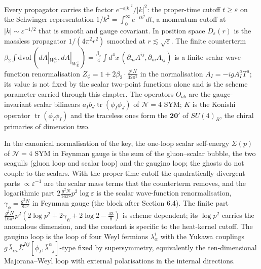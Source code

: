 \begin{remark}
Every propagator carries the factor $e^{-\varepsilon|k|^2}/|k|^2$: the proper-time cutoff $t\ge\varepsilon$ on the Schwinger representation $1/k^2=\int_0^\infty e^{-tk^2}dt$, a momentum cutoff at $|k|\sim\varepsilon^{-1/2}$ that is smooth and gauge covariant. In position space $D_\varepsilon(r)$ is the massless propagator $1/(4\pi^2r^2)$ smoothed at $r\lesssim\sqrt\varepsilon$. The finite counterterm $\beta_2\int\mathrm{dvol}\,(dA|_{W_{\mathbb R}^\perp},dA|_{W_{\mathbb R}^\perp})=\tfrac{\beta_2}4\int d^4x\,(\partial_mA^{ij},\partial_mA_{ij})$ is a finite scalar wave-function renormalisation $Z_\phi=1+2\beta_2\cdot\frac{g^2N}{32\pi^2}$ in the normalisation $A_I=-igA^a_IT^a$; its value is not fixed by the scalar two-point functions alone and is the scheme parameter carried through this chapter. The operators $O_{ab}$ are the gauge-invariant scalar bilinears $a_Ib_J\operatorname{tr}(\phi_I\phi_J)$ of $\mathcal N=4$ SYM; $K$ is the Konishi operator $\operatorname{tr}(\phi_I\phi_I)$ and the traceless ones form the $\mathbf{20'}$ of $SU(4)_R$, the chiral primaries of dimension two.
\end{remark}

\begin{remark}
In the canonical normalisation of the key, the one-loop scalar self-energy $\Sigma(p)$ of $\mathcal N=4$ SYM in Feynman gauge is the sum of the gluon--scalar bubble, the two seagulls (gluon loop and scalar loop) and the gaugino loop; the ghosts do not couple to the scalars. With the proper-time cutoff the quadratically divergent parts $\propto\varepsilon^{-1}$ are the scalar mass terms that the counterterm removes, and the logarithmic part $2\frac{g^2N}{16\pi^2}p^2\log\varepsilon$ is the scalar wave-function renormalisation, $\gamma_\phi=\frac{g^2N}{8\pi^2}$ in Feynman gauge (the block after Section 6.4). The finite part $\frac{g^2N}{16\pi^2}p^2(2\log p^2+2\gamma_E+2\log2-\tfrac{43}8)$ is scheme dependent; its $\log p^2$ carries the anomalous dimension, and the constant is specific to the heat-kernel cutoff. The gaugino loop is the loop of four Weyl fermions $\lambda^i_\alpha$ with the Yukawa couplings $g\,\bar\lambda_{\dot\alpha i}\bar\Sigma^{Iij}[\phi_I,\bar\lambda^{\dot\alpha}{}_j]$-type fixed by supersymmetry, equivalently the ten-dimensional Majorana--Weyl loop with external polarisations in the internal directions.
\end{remark}

